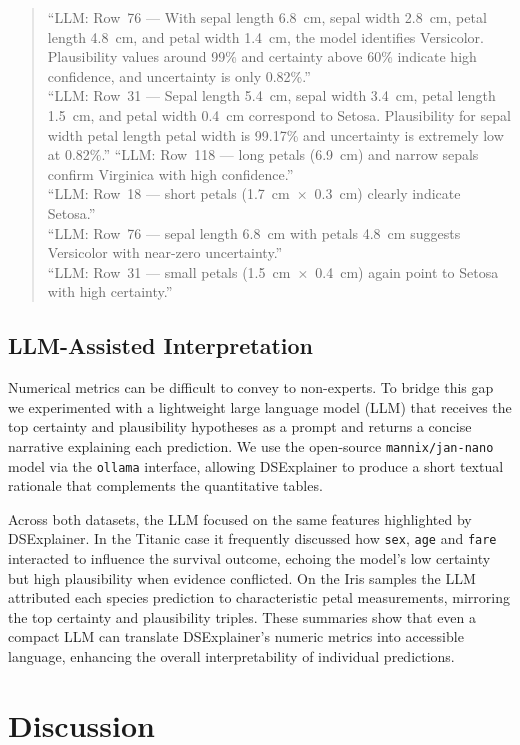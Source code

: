 \documentclass[acmlarge]{acmart}
\begin{document}
\begin{quote}
``LLM: Row~76 --- With sepal length 6.8~cm, sepal width 2.8~cm, petal length 4.8~cm, and petal width 1.4~cm, the model identifies Versicolor. Plausibility values around 99\% and certainty above 60\% indicate high confidence, and uncertainty is only 0.82\%.''\\
``LLM: Row~31 --- Sepal length 5.4~cm, sepal width 3.4~cm, petal length 1.5~cm, and petal width 0.4~cm correspond to Setosa. Plausibility for sepal width \times petal length \times petal width is 99.17\% and uncertainty is extremely low at 0.82\%.''
``LLM: Row~118 --- long petals (6.9~cm) and narrow sepals confirm Virginica with high confidence.''\\
``LLM: Row~18 --- short petals (1.7~cm~$\times$~0.3~cm) clearly indicate Setosa.''\\
``LLM: Row~76 --- sepal length 6.8~cm with petals 4.8~cm suggests Versicolor with near-zero uncertainty.''\\
``LLM: Row~31 --- small petals (1.5~cm~$\times$~0.4~cm) again point to Setosa with high certainty.''
\end{quote}
\subsection{LLM-Assisted Interpretation}

Numerical metrics can be difficult to convey to non-experts. To bridge this gap we experimented with a lightweight large language model (LLM) that receives the top certainty and plausibility hypotheses as a prompt and returns a concise narrative explaining each prediction. We use the open-source \texttt{mannix/jan-nano} model via the \texttt{ollama} interface, allowing DSExplainer to produce a short textual rationale that complements the quantitative tables.

Across both datasets, the LLM focused on the same features highlighted by DSExplainer. In the Titanic case it frequently discussed how \texttt{sex}, \texttt{age} and \texttt{fare} interacted to influence the survival outcome, echoing the model's low certainty but high plausibility when evidence conflicted. On the Iris samples the LLM attributed each species prediction to characteristic petal measurements, mirroring the top certainty and plausibility triples. These summaries show that even a compact LLM can translate DSExplainer's numeric metrics into accessible language, enhancing the overall interpretability of individual predictions.


\section{Discussion}
\end{document}
